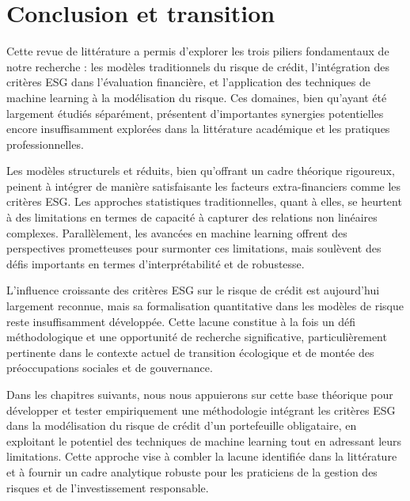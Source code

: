 \section{Conclusion et transition}

Cette revue de littérature a permis d'explorer les trois piliers fondamentaux de notre recherche : les modèles traditionnels du risque de crédit, l'intégration des critères ESG dans l'évaluation financière, et l'application des techniques de machine learning à la modélisation du risque. Ces domaines, bien qu'ayant été largement étudiés séparément, présentent d'importantes synergies potentielles encore insuffisamment explorées dans la littérature académique et les pratiques professionnelles.

Les modèles structurels et réduits, bien qu'offrant un cadre théorique rigoureux, peinent à intégrer de manière satisfaisante les facteurs extra-financiers comme les critères ESG. Les approches statistiques traditionnelles, quant à elles, se heurtent à des limitations en termes de capacité à capturer des relations non linéaires complexes. Parallèlement, les avancées en machine learning offrent des perspectives prometteuses pour surmonter ces limitations, mais soulèvent des défis importants en termes d'interprétabilité et de robustesse.

L'influence croissante des critères ESG sur le risque de crédit est aujourd'hui largement reconnue, mais sa formalisation quantitative dans les modèles de risque reste insuffisamment développée. Cette lacune constitue à la fois un défi méthodologique et une opportunité de recherche significative, particulièrement pertinente dans le contexte actuel de transition écologique et de montée des préoccupations sociales et de gouvernance.

Dans les chapitres suivants, nous nous appuierons sur cette base théorique pour développer et tester empiriquement une méthodologie intégrant les critères ESG dans la modélisation du risque de crédit d'un portefeuille obligataire, en exploitant le potentiel des techniques de machine learning tout en adressant leurs limitations. Cette approche vise à combler la lacune identifiée dans la littérature et à fournir un cadre analytique robuste pour les praticiens de la gestion des risques et de l'investissement responsable.
